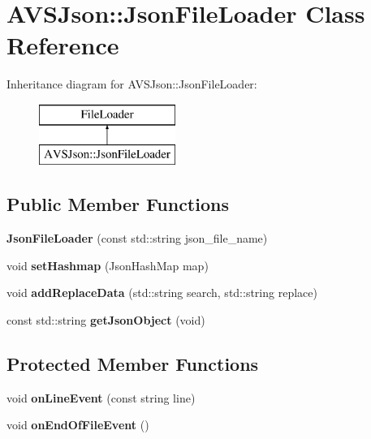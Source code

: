 \hypertarget{classAVSJson_1_1JsonFileLoader}{}\section{A\+V\+S\+Json\+:\+:Json\+File\+Loader Class Reference}
\label{classAVSJson_1_1JsonFileLoader}
Inheritance diagram for A\+V\+S\+Json\+:\+:Json\+File\+Loader\+:\begin{figure}[H]
\begin{center}
\leavevmode
\includegraphics[height=2.000000cm]{d4/dbe/classAVSJson_1_1JsonFileLoader}
\end{center}
\end{figure}
\subsection*{Public Member Functions}
\begin{DoxyCompactItemize}
\item 
\mbox{\label{classAVSJson_1_1JsonFileLoader_a7edbb0f861213e85bc835ee4bbd9e2df}} 
{\bfseries Json\+File\+Loader} (const std\+::string json\+\_\+file\+\_\+name)
\item 
\mbox{\label{classAVSJson_1_1JsonFileLoader_a864a274a345d6f1a16973e6abfedad76}} 
void {\bfseries set\+Hashmap} (Json\+Hash\+Map map)
\item 
\mbox{\label{classAVSJson_1_1JsonFileLoader_a05e6ad6b705addf961268179811f8976}} 
void {\bfseries add\+Replace\+Data} (std\+::string search, std\+::string replace)
\item 
\mbox{\label{classAVSJson_1_1JsonFileLoader_aa97f567ba6e9c358cc361109b5d23e72}} 
const std\+::string {\bfseries get\+Json\+Object} (void)
\end{DoxyCompactItemize}
\subsection*{Protected Member Functions}
\begin{DoxyCompactItemize}
\item 
\mbox{\label{classAVSJson_1_1JsonFileLoader_a39ca49e1e9168bc54564a90ff81cb562}} 
void {\bfseries on\+Line\+Event} (const string line)
\item 
\mbox{\label{classAVSJson_1_1JsonFileLoader_a7562ccc54984ea688e13b5fce560126c}} 
void {\bfseries on\+End\+Of\+File\+Event} ()
\end{DoxyCompactItemize}


